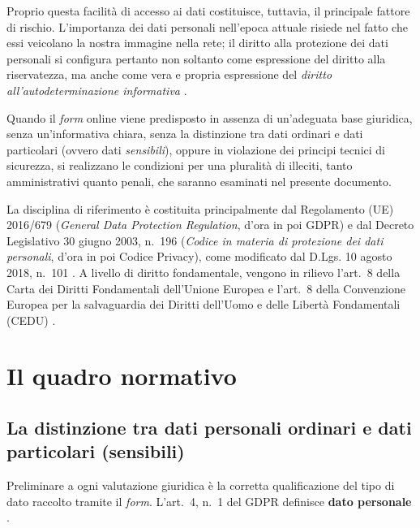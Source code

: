 \documentclass[12pt, a4paper]{article}
\begin{document}
Proprio questa facilità di accesso ai dati costituisce, tuttavia, il principale
fattore di rischio. L'importanza dei dati personali nell'epoca attuale risiede nel fatto che
essi veicolano la nostra immagine nella rete; il diritto alla protezione
dei dati personali si configura pertanto non soltanto come espressione del
diritto alla riservatezza, ma anche come vera e propria espressione
del \emph{diritto all'autodeterminazione informativa}
\autocite[p.~38, \S~2.7]{pietropaoli2022}.

Quando il \emph{form} online viene predisposto in assenza di un'adeguata base
giuridica, senza un'informativa chiara, senza la distinzione tra dati ordinari e
dati particolari (ovvero dati \emph{sensibili}), oppure in violazione dei principi tecnici
di sicurezza, si realizzano le condizioni per una pluralità di illeciti, tanto
amministrativi quanto penali, che saranno esaminati nel presente documento.

La disciplina di riferimento è costituita principalmente dal Regolamento
(UE) 2016/679 (\emph{General Data Protection Regulation}, d'ora in poi GDPR)
\autocite{gdpr2016} e dal Decreto Legislativo 30 giugno 2003, n.~196
(\emph{Codice in materia di protezione dei dati personali}, d'ora in poi Codice
Privacy), come modificato dal D.Lgs. 10 agosto 2018, n.~101
\autocite{codiceprivacy2003, dlgs101_2018}. A livello di diritto fondamentale,
vengono in rilievo l'art.~8 della Carta dei Diritti Fondamentali dell'Unione
Europea \autocite{carta_nizza} e l'art.~8 della Convenzione Europea per la
salvaguardia dei Diritti dell'Uomo e delle Libertà Fondamentali (CEDU)
\autocite{cedu}.

\section{Il quadro normativo}
\label{sec:normativa}

\subsection{La distinzione tra dati personali ordinari e dati particolari (sensibili)}
\label{sub:dati}

Preliminare a ogni valutazione giuridica è la corretta qualificazione del tipo
di dato raccolto tramite il \emph{form}. L'art.~4, n.~1 del GDPR definisce \textbf{dato
personale} .
\end{document}
